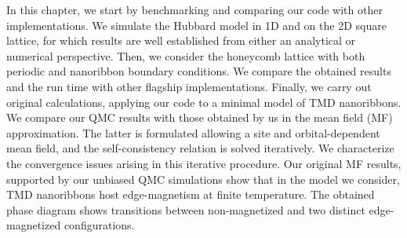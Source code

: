 
\label{cap:applications}

\slshape

In this chapter, we start by benchmarking and comparing our code with other implementations.
We simulate the Hubbard model in \acs{1D} and on the \acs{2D} square lattice, for which results are well established from either an analytical or numerical perspective.
Then, we consider the honeycomb lattice with both periodic and nanoribbon boundary conditions.
We compare the obtained results and the run time with other flagship implementations.
Finally, we carry out original calculations, applying our code to a minimal model of \acs{TMD} nanoribbons.
We compare our \acs{QMC} results with those obtained by us in the mean field (MF)  approximation.
The latter is formulated allowing a site and orbital-dependent mean field, and the self-consistency relation is solved iteratively.
We characterize the convergence issues arising in this iterative procedure.
Our original MF results, supported by our unbiased \acs{QMC} simulations show that in the model we consider, \acs{TMD} nanoribbons host edge-magnetism at finite temperature.
The obtained phase diagram shows  transitions between non-magnetized and two distinct edge-magnetized configurations.

\normalfont





